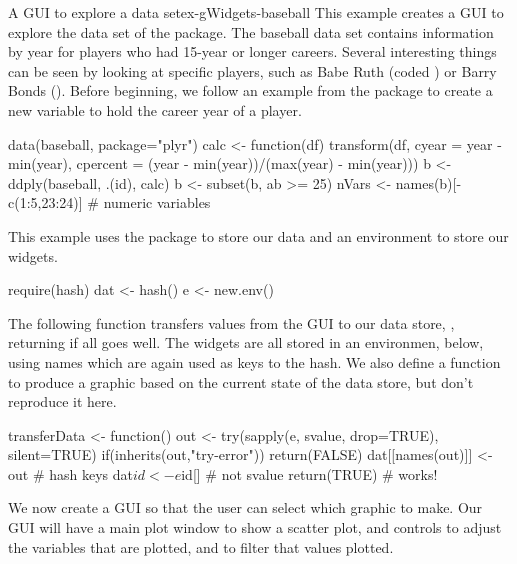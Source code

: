 \begin{example}{A GUI to explore a data set}{ex-gWidgets-baseball}
This example creates a GUI to explore the  data set of
the  package.  The baseball data set contains information by
year for players who had 15-year or longer careers. Several
interesting things can be seen by looking at specific players, such as
Babe Ruth (coded ) or Barry Bonds ().
Before beginning, we follow an example from the  package to create a
new variable to hold the career year of a player.
\begin{Schunk}
\begin{Sinput}
 data(baseball, package="plyr")
 calc <- function(df) 
   transform(df,
             cyear = year - min(year),
             cpercent = (year - min(year))/(max(year) - min(year)))
 b <- ddply(baseball, .(id), calc)
 b <- subset(b, ab >= 25) 
 nVars <- names(b)[-c(1:5,23:24)]    # numeric variables
\end{Sinput}
\end{Schunk}

This example uses the  package to store our data and an environment to store our widgets.
\begin{Schunk}
\begin{Sinput}
 require(hash)
 dat <- hash()
 e <- new.env()
\end{Sinput}
\end{Schunk}

The following function transfers values from the GUI to our data
store, , returning  if all goes well. The widgets
are all stored in an environmen,  below, using names which
are again used as keys to the hash. We also define a function
 to produce a graphic based on the current state of the
data store, but don't reproduce it here.
\begin{Schunk}
\begin{Sinput}
 transferData <- function() {
   out <- try(sapply(e, svalue, drop=TRUE), silent=TRUE)
   if(inherits(out,"try-error"))
     return(FALSE)
   dat[[names(out)]] <- out              # hash keys
   dat$id <- e$id[]                      # not svalue
   return(TRUE)                          # works!
 }
\end{Sinput}
\end{Schunk}


We now create a GUI so that the user can select which graphic to
make. Our GUI will have a main plot window to show a scatter plot, and
controls to adjust the variables that are plotted, and to filter that
values plotted. 


\end{example}
